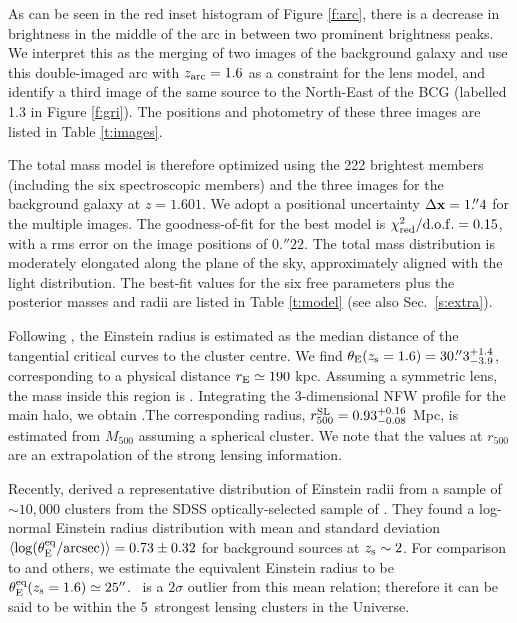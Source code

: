 As can be seen in the red inset histogram of Figure \ref{f:arc}, there is a decrease in brightness 
in the middle of the arc in between two prominent brightness peaks. We interpret this as the 
merging of two images of the background galaxy and use this double-imaged arc with $z_{\rm 
arc}=1.6$ as a constraint for the lens model, and identify a third image of the same source to the 
North-East of the BCG (labelled 1.3 in Figure \ref{f:gri}). The positions and photometry of these 
three images are listed in Table \ref{t:images}.

The total mass model is therefore optimized using the 222 brightest members (including the six
spectroscopic members) and the three images for the background galaxy at $z=1.601$. We adopt a
positional uncertainty $\Delta{\bf x}=1.\!''4$ for the multiple images. The goodness-of-fit for
the best model is $\chi^2_{\rm red}/{\rm d.o.f.} = 0.15$, with a rms error on the image positions of 
$0.\!''22$. The total mass distribution is moderately elongated along the plane of the sky, 
approximately aligned with the light distribution. The best-fit values for the six free parameters 
plus the posterior masses and radii are listed in Table \ref{t:model} (see also Sec.\ 
\ref{s:extra}).

Following \cite{meneghetti11}, the Einstein radius is estimated as the median distance of the tangential critical curves to the cluster centre. We find $\theta_{\rm E}(z_{\rm s}=1.6)=30.\!''3_{-3.9}^{+1.4}$, corresponding to a physical distance $r_{\rm E}\simeq190$ kpc. Assuming a symmetric lens, the mass inside this region is \emass. Integrating the 3-dimensional NFW profile for the main halo, we obtain \mass.The corresponding radius, $r_{500}^{\rm SL}=0.93_{-0.08}^{+0.16}$ Mpc, is estimated from $M_{500}$ assuming a spherical cluster. We note that the values at $r_{500}$ are an extrapolation of the strong lensing information.

Recently, \cite{zitrin12_sdss} derived a representative distribution of Einstein radii from a sample of $\sim10,000$ clusters from the SDSS optically-selected sample of \cite{hao10}. They found a log-normal Einstein radius distribution with mean and standard deviation  $\langle\log(\theta_{\rm E}^{\rm eq}/{\rm arcsec})\rangle=0.73\pm0.32$ for background sources at $z_{\rm s}\sim2$. For comparison to \cite{zitrin12_sdss} and others, we estimate the equivalent Einstein radius to be $\theta_{\rm E}^{\rm eq}(z_{\rm s}=1.6)\simeq25''$. \plck\ is a $2\sigma$ outlier from this mean relation; therefore it can be said to be within the 5\percent\ strongest lensing clusters in the Universe.

